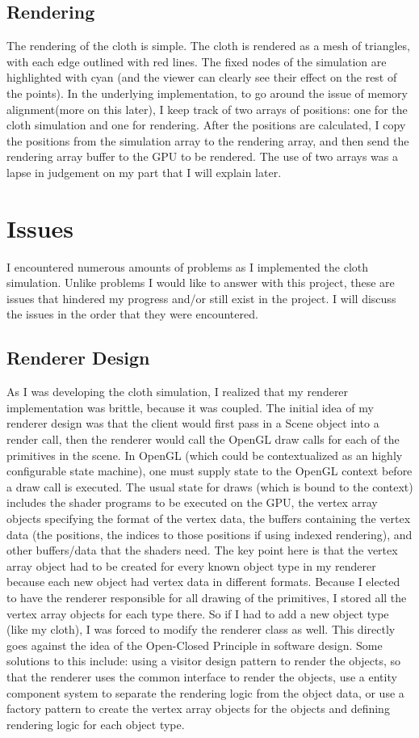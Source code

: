 \documentclass[letterpaper, 10 pt, conference]{ieeeconf}  %
\begin{document}
\subsection{Rendering}
The rendering of the cloth is simple. The cloth is rendered as a mesh of triangles, with each edge outlined with red lines. The fixed nodes of the simulation are highlighted with cyan (and the viewer can clearly see their effect on the rest of the points). In the underlying implementation, to go around the issue of memory alignment(more on this later), I keep track of two arrays of positions: one for the cloth simulation and one for rendering. After the positions are calculated, I copy the positions from the simulation array to the rendering array, and then send the rendering array buffer to the GPU to be rendered. The use of two arrays was a lapse in judgement on my part that I will explain later. 


\section{Issues}
        I encountered numerous amounts of problems as I implemented the cloth simulation. Unlike problems I would like to answer with this project, these are issues that hindered my progress and/or still exist in the project. I will discuss the issues in the order that they were encountered.

\subsection{Renderer Design}
        As I was developing the cloth simulation, I realized that my renderer implementation was brittle, because it was coupled. The initial idea of my renderer design was that the client would first pass in a Scene object into a render call, then the renderer would call the OpenGL draw calls for each of the primitives in the scene. In OpenGL (which could be contextualized as an highly configurable state machine), one must supply state to the OpenGL context before a draw call is executed. The usual state for draws (which is bound to the context) includes the shader programs to be executed on the GPU, the vertex array objects specifying the format of the vertex data, the buffers containing the vertex data (the positions, the indices to those positions if using indexed rendering), and other buffers/data that the shaders need. The key point here is that the vertex array object had to be created for every known object type in my renderer because each new object had vertex data in different formats. Because I elected to have the renderer responsible for all drawing of the primitives, I stored all the vertex array objects for each type there. So if I had to add a new object type (like my cloth), I was forced to modify the renderer class as well. This directly goes against the idea of the Open-Closed Principle in software design. Some solutions to this include: using a visitor design pattern to render the objects, so that the renderer uses the common interface to render the objects, use a entity component system to separate the rendering logic from the object data, or use a factory pattern to create the vertex array objects for the objects and defining rendering logic for each object type.
\end{document}
